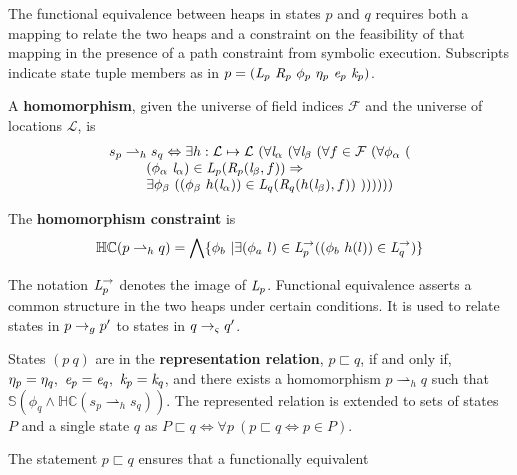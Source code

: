 The functional equivalence between heaps in states $p$
and $q$ requires both a mapping to relate the two heaps and a
constraint on the feasibility of that mapping in the presence of a
path constraint from symbolic execution. Subscripts indicate state tuple
members as in $p = (
\emph{L}_p\ \emph{R}_p\ \phi_p\ \eta_p\ \emph{e}_p\ \emph{k}_p )$.
\begin{definition}
\label{def:homomorphism}
A \textbf{homomorphism}, given the universe of field indices $\mathcal{F}$ and the universe of locations $\mathcal{L}$, is 
$$
\begin{array}{l}
 s_p \rightharpoonup_{h} s_q \Leftrightarrow 
\exists h: \mathcal{L} \mapsto \mathcal{L}\ (\forall \cfgnt{l}_\alpha\ (\forall \cfgnt{l}_\beta\ (\forall f \in \mathcal{F}\ ( \forall \phi_\alpha\ (\\ 
\ \ \ \ \ \ \ \ (\phi_\alpha\ \cfgnt{l}_\alpha) \in \cfgnt{L}_p(\cfgnt{R}_p (\cfgnt{l}_\beta,f )) \Rightarrow \\
\ \ \ \ \ \ \ \ \exists \phi_\beta\ ( (\phi_\beta\ h(\cfgnt{l}_\alpha))\in \cfgnt{L}_q(\cfgnt{R}_q (h(\cfgnt{l}_\beta),f ))\ 
 )) ) ) ) )
\end{array}
$$
\end{definition}
\begin{definition}
\label{def:hc}
The \textbf{homomorphism constraint} is
\[
\mathbb{HC}(p \rightharpoonup_{h} q) = 
\bigwedge \{ \phi_b\ | \exists (\phi_a\ l) \in \emph{L}_p^\rightarrow ( (\phi_b\ h(l)) \in \emph{L}_q^\rightarrow)\}
\]
\end{definition}
The notation $\emph{L}_p^\rightarrow$ denotes the image of $\emph{L}_p$. Functional equivalence asserts a common structure in the two heaps under certain
conditions. It is used to relate states in $p \rightarrow_{g}
p^\prime$ to states in $q \rightarrow_{\varsigma} q^\prime$.
\begin{definition}
\label{representation}
States $(p\ q)$ are in the \textbf{representation relation}, $p \sqsubset q$, if and only if, $\eta_p = \eta_q ,\ \cfgnt{e}_p =
\cfgnt{e}_q ,\ \cfgnt{k}_p = \cfgnt{k}_q$, and there exists a
homomorphism $p \rightharpoonup_{h} q$
such that $\mathbb{S}( \phi_q \wedge \mathbb{HC}(s_p \rightharpoonup_{h} s_q) )$.
The represented relation is extended to sets of states $P$ and a single state $q$ as
$P \sqsubset q \Longleftrightarrow \forall p\ (p \sqsubset q \Leftrightarrow p \in P)$.
\end{definition}
The statement $p \sqsubset q$ ensures that a functionally equivalent
